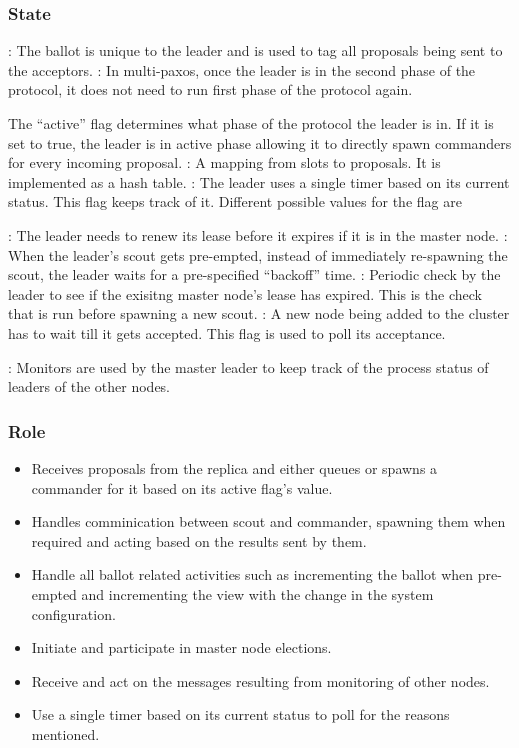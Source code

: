 \subsubsection{State}

\begin{itemize}
    : The ballot is unique to the leader and is used to tag all
    proposals being sent to the acceptors.
    : In multi-paxos, once the leader is in the second phase of
    the protocol, it does not need to run first phase of the protocol again.

    The ``active'' flag determines what phase of the protocol the leader is in.
    If it is set to true, the leader is in active phase allowing it to directly
    spawn commanders for every incoming proposal.
    : A mapping from slots to proposals. It is implemented as
    a hash table.
    : The leader uses a single timer based on its current
    status. This flag keeps track of it. Different possible values for the flag
    are
    \begin{itemize}
        : The leader needs to renew its lease before it expires if
        it is in the master node.
        : When the leader's scout gets pre-empted, instead of
        immediately re-spawning the scout, the leader waits for a pre-specified
        ``backoff'' time.
        : Periodic check by the leader to see if the
        exisitng master node's lease has expired. This is the check that is run
        before spawning a new scout.
        : A new node being added to the cluster has to wait
        till it gets accepted. This flag is used to poll its acceptance.
    \end{itemize}
    : Monitors are used by the master leader to keep track of
    the process status of leaders of the other nodes.
\end{itemize}

\subsubsection{Role}

\begin{itemize}
  \item Receives proposals from the replica and either queues or spawns a
    commander for it based on its active flag's value.
  \item Handles comminication between scout and commander, spawning them
    when required and acting based on the results sent by them.
  \item Handle all ballot related activities such as incrementing the ballot
    when pre-empted and incrementing the view with the change in the system
    configuration.
  \item Initiate and participate in master node elections.
  \item Receive and act on the messages resulting from monitoring of other
    nodes.
  \item Use a single timer based on its current status to poll for the
    reasons mentioned.
\end{itemize}

